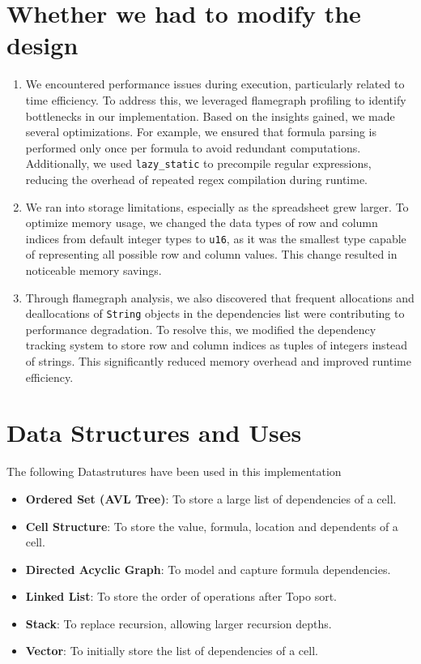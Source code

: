 \documentclass[10pt,a4paper]{article}  %
\begin{document}
\section{Whether we had to modify the design}
\begin{enumerate}
    \item We encountered performance issues during execution, particularly related to time efficiency. To address this, we leveraged flamegraph profiling to identify bottlenecks in our implementation. Based on the insights gained, we made several optimizations. For example, we ensured that formula parsing is performed only once per formula to avoid redundant computations. Additionally, we used \texttt{lazy\_static} to precompile regular expressions, reducing the overhead of repeated regex compilation during runtime.

    \item We ran into storage limitations, especially as the spreadsheet grew larger. To optimize memory usage, we changed the data types of row and column indices from default integer types to \texttt{u16}, as it was the smallest type capable of representing all possible row and column values. This change resulted in noticeable memory savings.

    \item Through flamegraph analysis, we also discovered that frequent allocations and deallocations of \texttt{String} objects in the dependencies list were contributing to performance degradation. To resolve this, we modified the dependency tracking system to store row and column indices as tuples of integers instead of strings. This significantly reduced memory overhead and improved runtime efficiency.
\end{enumerate}

\section{Data Structures and Uses}
            The following Datastrutures have been used in this implementation
            
            \begin{itemize}
                \item \textbf{Ordered Set (AVL Tree)}: To store a large list of dependencies of a cell.
                \item \textbf{Cell Structure}: To store the value, formula, location and dependents of a cell.
                \item \textbf{Directed Acyclic Graph}: To model and capture formula dependencies.
                \item \textbf{Linked List}: To store the order of operations after Topo sort.
                \item \textbf{Stack}: To replace recursion, allowing larger recursion depths.
                \item \textbf{Vector}: To initially store the list of dependencies of a cell.
            \end{itemize}
\end{document}
